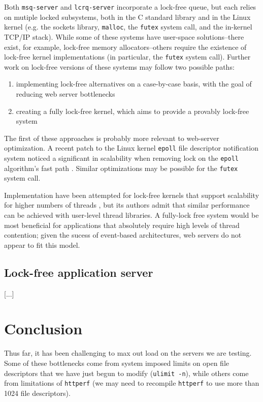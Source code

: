 \documentclass[twoside,10pt]{article}
\begin{document}
\begin{multicols}{2}
Both \verb+msq-server+ and \verb+lcrq-server+ incorporate a lock-free
queue, but each relies on mutiple locked subsystems, both in the C
standard library and in the Linux kernel (e.g. the sockets library,
\verb+malloc+, the \verb+futex+ system call, and the in-kernel TCP/IP
stack). While some of these systems have user-space solutions\---there
exist, for example, lock-free memory allocators\---others require the
existence of lock-free kernel implementations (in particular, the
\verb+futex+ system call). Further work on lock-free versions of these
systems may follow two possible paths:
\begin{enumerate}
\item implementing lock-free alternatives on a case-by-case basis,
  with the goal of reducing web server bottlenecks 
\item creating a fully lock-free kernel, which aims to provide a
  provably lock-free system
\end{enumerate}

The first of these approaches is probably more relevant to web-server
optimization. A recent patch to the Linux kernel \verb+epoll+ file
descriptor notification system noticed a significant in scalability
when removing lock on the \verb+epoll+ algorithm's fast path
\cite{lockfree-epoll}. Similar optimizations may be possible for the
\verb+futex+ system call.

Implementation have been attempted for lock-free kernels that support
scalability for higher numbers of threads \cite{massalin1992lock}, but
its authors admit that similar performance can be achieved with
user-level thread libraries. A fully-lock free system would be most
beneficial for applications that absolutely require high levels of
thread contention; given the sucess of event-based architectures, web
servers do not appear to fit this model.

\subsection{Lock-free application server}

[...]

\section{Conclusion}

Thus far, it has been challenging to max out load on the servers we
are testing. Some of these bottlenecks come from system imposed limits
on open file descriptors that we have just begun to modify
(\verb+ulimit -n+), while others come from limitations of
\verb+httperf+ (we may need to recompile \verb+httperf+ to use more
than 1024 file descriptors).


\end{multicols}
\end{document}
